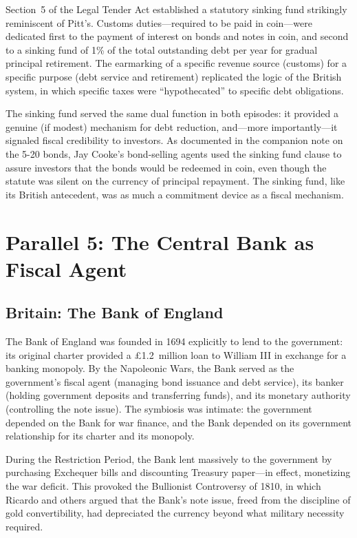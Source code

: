 \documentclass[12pt]{article}
\begin{document}
Section~5 of the Legal Tender Act established a statutory sinking
fund strikingly reminiscent of Pitt's. Customs duties---required to be
paid in coin---were dedicated first to the payment of interest on bonds
and notes in coin, and second to a sinking fund of 1\% of the total
outstanding debt per year for gradual principal retirement. The
earmarking of a specific revenue source (customs) for a specific purpose
(debt service and retirement) replicated the logic of the British
system, in which specific taxes were ``hypothecated'' to specific debt
obligations.

The sinking fund served the same dual function in both episodes: it
provided a genuine (if modest) mechanism for debt reduction, and---more
importantly---it signaled fiscal credibility to investors. As documented
in the companion note on the 5-20 bonds, Jay Cooke's bond-selling
agents used the sinking fund clause to assure investors that the bonds
would be redeemed in coin, even though the statute was silent on the
currency of principal repayment. The sinking fund, like its British
antecedent, was as much a commitment device as a fiscal mechanism.

\section{Parallel 5: The Central Bank as Fiscal Agent}
\label{sec:central-bank}

\subsection{Britain: The Bank of England}

The Bank of England was founded in 1694 explicitly to lend to the
government: its original charter provided a \pounds 1.2~million loan to
William III in exchange for a banking monopoly. By the Napoleonic Wars,
the Bank served as the government's fiscal agent (managing bond
issuance and debt service), its banker (holding government deposits and
transferring funds), and its monetary authority (controlling the note
issue). The symbiosis was intimate: the government depended on the Bank
for war finance, and the Bank depended on its government relationship
for its charter and its monopoly.

During the Restriction Period, the Bank lent massively to the
government by purchasing Exchequer bills and discounting Treasury
paper---in effect, monetizing the war deficit. This provoked the
Bullionist Controversy of 1810, in which Ricardo and others argued that
the Bank's note issue, freed from the discipline of gold convertibility,
had depreciated the currency beyond what military necessity required.
\end{document}
